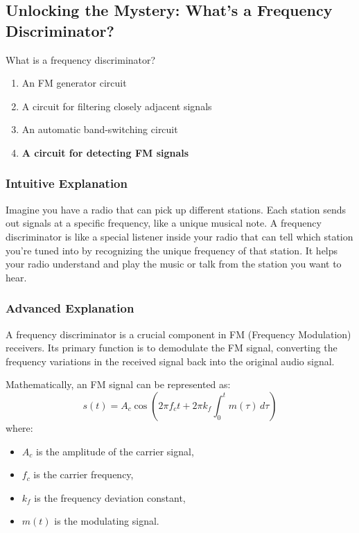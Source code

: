 \subsection{Unlocking the Mystery: What’s a Frequency Discriminator?}

\begin{tcolorbox}[colback=gray!10!white,colframe=black!75!black,title=E7E03] What is a frequency discriminator?
    \begin{enumerate}[label=\Alph*.]
        \item An FM generator circuit
        \item A circuit for filtering closely adjacent signals
        \item An automatic band-switching circuit
        \item \textbf{A circuit for detecting FM signals}
    \end{enumerate}
\end{tcolorbox}

\subsubsection{Intuitive Explanation}
Imagine you have a radio that can pick up different stations. Each station sends out signals at a specific frequency, like a unique musical note. A frequency discriminator is like a special listener inside your radio that can tell which station you’re tuned into by recognizing the unique frequency of that station. It helps your radio understand and play the music or talk from the station you want to hear.

\subsubsection{Advanced Explanation}
A frequency discriminator is a crucial component in FM (Frequency Modulation) receivers. Its primary function is to demodulate the FM signal, converting the frequency variations in the received signal back into the original audio signal. 

Mathematically, an FM signal can be represented as:
\[ s(t) = A_c \cos\left(2\pi f_c t + 2\pi k_f \int_0^t m(\tau) \, d\tau\right) \]
where:
\begin{itemize}
    \item \( A_c \) is the amplitude of the carrier signal,
    \item \( f_c \) is the carrier frequency,
    \item \( k_f \) is the frequency deviation constant,
    \item \( m(t) \) is the modulating signal.
\end{itemize}

